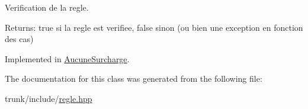 Verification de la regle. 

\begin{Desc}
\item[Returns:]true si la regle est verifiee, false sinon (ou bien une exception en fonction des cas) \end{Desc}


Implemented in \hyperlink{classAucuneSurcharge_d96084db10b49f9c48f6cb005248f7c4}{AucuneSurcharge}.

The documentation for this class was generated from the following file:\begin{CompactItemize}
\item 
trunk/include/\hyperlink{regle_8hpp}{regle.hpp}\end{CompactItemize}
